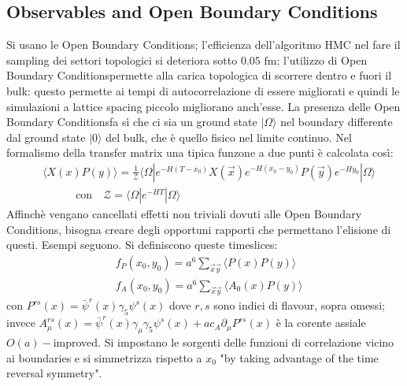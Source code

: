 \documentclass[12pt,a4paper,openright]{article}
\newcommand{\la}{\langle}
\newcommand{\ra}{\rangle}
\newcommand{\colg}{\textcolor{PineGreen}}
\newcommand{\fm}{\text{ fm}}
\newcommand{\oai}{$O(a)-$improved}
\newcommand{\obc}{Open Boundary Conditions}
\begin{document}
\subsection{Observables and \obc}
\colg{Si usano le \obc; l'efficienza dell'algoritmo HMC nel fare il sampling dei settori topologici si deteriora sotto $0.05\fm$;
l'utilizzo di \obc  permette alla carica topologica di scorrere dentro e fuori il bulk: questo permette ai tempi di autocorrelazione di essere migliorati e quindi le simulazioni a lattice spacing piccolo migliorano anch'esse}.
\newline \newline
\colg{La presenza delle \obc fa sì che ci sia un ground state $|\Omega \ra$ nel boundary differente dal ground state $| 0 \ra$ del bulk, che è quello fisico nel limite continuo.}
Nel formalismo della transfer matrix una tipica funzone a due punti è calcolata così:
\begin{equation*}
  \begin{aligned}
    & \la X(x) P(y) \ra = \frac{1}{\mathcal Z} \la \Omega | e^{-H (T-x_0)} X(\vec{x}) e^{-H(x_0 -y_0)} P(\vec y) e^{-Hy_0} | \Omega \ra \\
    & \quad\quad\quad \text{con} \quad \mathcal{Z} = \la \Omega | e^{-HT} | \Omega \ra
  \end{aligned}
\end{equation*}
\colg{Affinchè vengano cancellati effetti non triviali dovuti alle \obc, bisogna creare degli opportuni rapporti che permettano l'elisione di questi.}
\newline
Esempi seguono. Si definiscono queste timeslices:
\begin{equation}\label{eq:timelices-PP-AP}
  \begin{aligned}
    & f_P(x_0,y_0) = a^6 \sum_{\vec x \vec y} \la P(x)P(y) \ra \\
    & f_A(x_0,y_0) = a^6 \sum_{\vec x \vec y} \la A_0(x)P(y) \ra 
  \end{aligned}
\end{equation}
con $P^{rs}(x) = \bar\psi^r (x) \gamma_5 \psi^s (x)$ dove $r,s$ sono indici di flavour, sopra omessi;
invece $A^{rs}_\mu (x) = \bar\psi^r (x) \gamma_\mu \gamma_5 \psi^s (x) + a c_A \partial_\mu P^{rs} (x)$ è la corente assiale \oai.
\colg{Si impostano le sorgenti delle funzioni di correlazione vicino ai boundaries e si simmetrizza rispetto a $x_0$ "by taking advantage of the time reversal symmetry"}.
\end{document}
